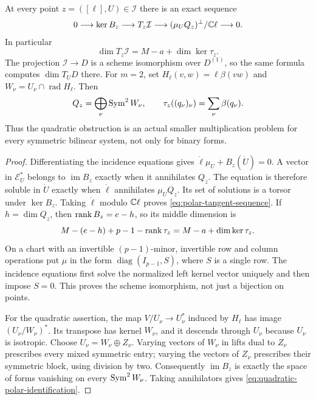 \begin{theorem}\label{thm:polar-tangent}
At every point $z=([\ell],U)\in\mathcal I$ there is an exact sequence
\begin{equation}\label{eq:polar-tangent-sequence}
 0\longrightarrow\ker B_z\longrightarrow T_z\mathcal I
 \longrightarrow(\mu_UQ_z)^\perp/\mathbb C\ell\longrightarrow0.
\end{equation}
In particular
\begin{equation}\label{eq:polar-tangent-dimension}
 \dim T_z\mathcal I=M-a+\dim\ker\tau_z.
\end{equation}
The projection $\mathcal I\to D$ is a scheme isomorphism over
$D^{(1)}$, so the same formula computes $\dim T_UD$ there.
For $m=2$, set $H_\ell(v,w)=\ell\beta(vw)$ and
$W_\nu=U_\nu\cap\operatorname{rad}H_\ell$. Then
\begin{equation}\label{eq:quadratic-polar-identification}
 Q_z=\bigoplus_\nu\operatorname{Sym}^2W_\nu,
 \qquad \tau_z((q_\nu)_\nu)=\sum_\nu\beta(q_\nu).
\end{equation}
Thus the quadratic obstruction is an actual smaller multiplication
problem for every symmetric bilinear system, not only for binary forms.
\end{theorem}
\begin{proof}
Differentiating the incidence equations gives
$\dot\ell\mu_U+B_z(\dot U)=0$. A vector in $\mathcal E_U^*$
belongs to $\operatorname{im}B_z$ exactly when it annihilates $Q_z$.
The equation is therefore soluble in $\dot U$ exactly when
$\dot\ell$ annihilates $\mu_UQ_z$. Its set of solutions is a torsor
under $\ker B_z$. Taking $\dot\ell$ modulo $\mathbb C\ell$ proves
\eqref{eq:polar-tangent-sequence}. If $h=\dim Q_z$, then
$\operatorname{rank} B_z=e-h$, so its middle dimension is
\[
 M-(e-h)+p-1-\operatorname{rank}\tau_z=M-a+\dim\ker\tau_z.
\]
On a chart with an invertible $(p-1)$-minor, invertible row and column
operations put $\mu$ in the form $\operatorname{diag}(I_{p-1},S)$,
where $S$ is a single row. The incidence equations first solve the
normalized left kernel vector uniquely and then impose $S=0$.
This proves the scheme isomorphism, not just a bijection on points.

For the quadratic assertion, the map $V/U_\nu\to U_\nu^*$ induced
by $H_\ell$ has image $(U_\nu/W_\nu)^*$. Its transpose has kernel
$W_\nu$, and it descends through $U_\nu$ because $U_\nu$ is
isotropic. Choose $U_\nu=W_\nu\oplus Z_\nu$. Varying vectors of
$W_\nu$ in lifts dual to $Z_\nu$ prescribes every mixed symmetric
entry; varying the vectors of $Z_\nu$ prescribes their symmetric
block, using division by two. Consequently $\operatorname{im}B_z$
is exactly the space of forms vanishing on every $\operatorname{Sym}^2W_\nu$.
Taking annihilators gives \eqref{eq:quadratic-polar-identification}.
\end{proof}

